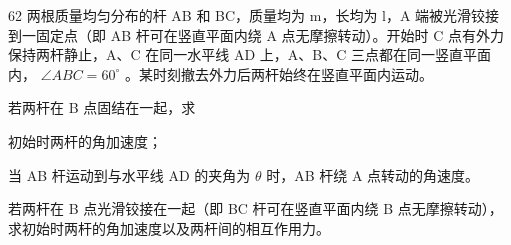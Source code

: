 \begin{problem}[33届物理竞赛复赛]{62}
    两根质量均匀分布的杆 AB 和 BC，质量均为 m，长均为 l，A 端被光滑铰接到一固定点（即 AB 杆可在竖直平面内绕 A 点无摩擦转动）。开始时 C 点有外力保持两杆静止，A、C 在同一水平线 AD 上，A、B、C 三点都在同一竖直平面内， $\angle ABC = 60^{\circ}$ 。某时刻撤去外力后两杆始终在竖直平面内运动。

    \begin{subproblem}
        若两杆在 B 点固结在一起，求

        \begin{subsubproblem}
            初始时两杆的角加速度；
        \end{subsubproblem}
        \begin{subsubproblem}
            当 AB 杆运动到与水平线 AD 的夹角为 $\theta$ 时，AB 杆绕 A 点转动的角速度。
        \end{subsubproblem}
    \end{subproblem}
    \begin{subproblem}
        若两杆在 B 点光滑铰接在一起（即 BC 杆可在竖直平面内绕 B 点无摩擦转动），求初始时两杆的角加速度以及两杆间的相互作用力。
    \end{subproblem}
\end{problem}